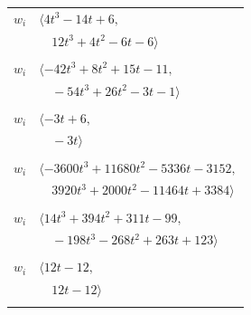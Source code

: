 \documentclass[11pt]{article}
\begin{document}
\begin{longtable}{@{}ll@{}}
$w_i$ & $\langle 4t^{3}-14t+6,$\\
 & $\quad 12t^{3}+4t^{2}-6t-6\rangle$\\
\addlinespace[2pt]
\multicolumn{2}{@{}p{0.97\textwidth}@{}}{$i=34$, $D_i=8$, $\rho_{ij}$: $1{:}2, \allowbreak 2{:}1, \allowbreak 6{:}3, \allowbreak 17{:}2, \allowbreak 18{:}2, \allowbreak 19{:}3, \allowbreak 20{:}3, \allowbreak 21{:}1, \allowbreak 33{:}3, \allowbreak 38{:}2$}\\
$w_i$ & $\langle -42t^{3}+8t^{2}+15t-11,$\\
 & $\quad -54t^{3}+26t^{2}-3t-1\rangle$\\
\addlinespace[2pt]
\multicolumn{2}{@{}p{0.97\textwidth}@{}}{$i=35$, $D_i=1$, $\rho_{ij}$: $10{:}1, \allowbreak 31{:}2, \allowbreak 32{:}1, \allowbreak 40{:}1$}\\
$w_i$ & $\langle -3t+6,$\\
 & $\quad -3t\rangle$\\
\addlinespace[2pt]
\multicolumn{2}{@{}p{0.97\textwidth}@{}}{$i=36$, $D_i=2$, $\rho_{ij}$: $5{:}1, \allowbreak 9{:}3, \allowbreak 10{:}2, \allowbreak 12{:}3, \allowbreak 14{:}3, \allowbreak 18{:}2, \allowbreak 28{:}1, \allowbreak 31{:}2, \allowbreak 33{:}3, \allowbreak 41{:}3$}\\
$w_i$ & $\langle -3600t^{3}+11680t^{2}-5336t-3152,$\\
 & $\quad 3920t^{3}+2000t^{2}-11464t+3384\rangle$\\
\addlinespace[2pt]
\multicolumn{2}{@{}p{0.97\textwidth}@{}}{$i=37$, $D_i=8$, $\rho_{ij}$: $3{:}3, \allowbreak 4{:}1, \allowbreak 10{:}1, \allowbreak 14{:}1, \allowbreak 21{:}2, \allowbreak 23{:}1, \allowbreak 27{:}3, \allowbreak 28{:}2, \allowbreak 29{:}1, \allowbreak 30{:}2, \allowbreak 32{:}1, \allowbreak 39{:}1, \allowbreak 41{:}3$}\\
$w_i$ & $\langle 14t^{3}+394t^{2}+311t-99,$\\
 & $\quad -198t^{3}-268t^{2}+263t+123\rangle$\\
\addlinespace[2pt]
\multicolumn{2}{@{}p{0.97\textwidth}@{}}{$i=38$, $D_i=2$, $e_i=2$, $\rho_{ij}$: $1{:}2, \allowbreak 5{:}2, \allowbreak 22{:}2, \allowbreak 34{:}2$}\\
$w_i$ & $\langle 12t-12,$\\
 & $\quad 12t-12\rangle$\\
\addlinespace[2pt]
\multicolumn{2}{@{}p{0.97\textwidth}@{}}{$i=39$, $D_i=8$, $e_i=3$, $\rho_{ij}$: $1{:}1, \allowbreak 7{:}3, \allowbreak 9{:}1, \allowbreak 10{:}2, \allowbreak 15{:}3, \allowbreak 18{:}2, \allowbreak 20{:}1, \allowbreak 22{:}1, \allowbreak 32{:}2, \allowbreak 33{:}1, \allowbreak 37{:}3$}\\

\end{longtable}
\end{document}

